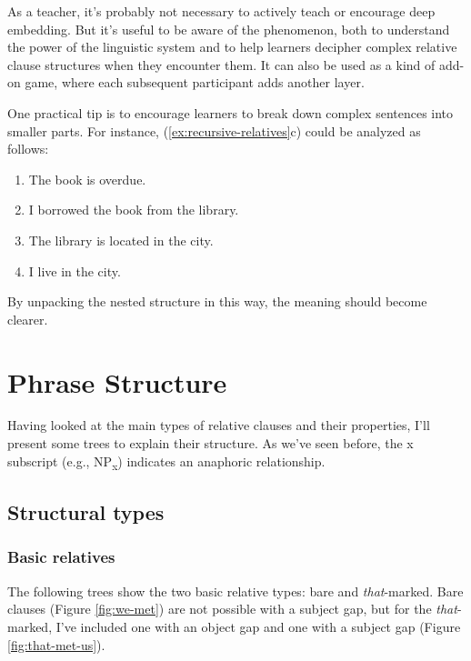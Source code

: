 As a teacher, it's probably not necessary to actively teach or encourage deep embedding. But it's useful to be aware of the phenomenon, both to understand the power of the linguistic system and to help learners decipher complex relative clause structures when they encounter them. It can also be used as a kind of add-on game, where each subsequent participant adds another layer.

One practical tip is to encourage learners to break down complex sentences into smaller parts. For instance, (\ref{ex:recursive-relatives}c) could be analyzed as follows:

\begin{enumerate}[noitemsep]
    \item The book is overdue.
    \item I borrowed the book from the library.
    \item The library is located in the city.
    \item I live in the city.
\end{enumerate}

By unpacking the nested structure in this way, the meaning should become clearer.

\section{Phrase Structure}
Having looked at the main types of relative clauses and their properties, I'll present some trees to explain their structure. As we've seen before, the x subscript (e.g., NP\textsubscript{x}) indicates an anaphoric relationship.

\subsection{Structural types}
\subsubsection*{Basic relatives}

The following trees show the two basic relative types: bare and \textit{that}-marked. Bare clauses (Figure \ref{fig:we-met}) are not possible with a subject gap, but for the \textit{that}-marked, I've included one with an object gap and one with a subject gap (Figure \ref{fig:that-met-us}).

